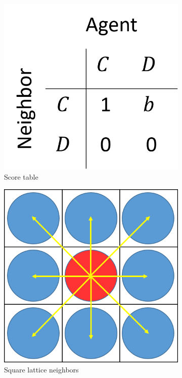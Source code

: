 \documentclass[a4paper,12pt]{article}
\begin{document}
\begin{figure}[h]
	\centering
	\begin{subfigure}[b]{0.4\textwidth}
		\includegraphics[width = \textwidth]{Game_score_table.png}
		\caption{Score table}	
		\label{fig:score table}	
	\end{subfigure}
	\begin{subfigure}[b]{0.4\textwidth}
		\includegraphics[width = \textwidth]{Games_with_neighbors_pic.png}
		\caption{Square lattice neighbors}
	\end{subfigure}
	\caption{}
\end{figure}
\end{document}
